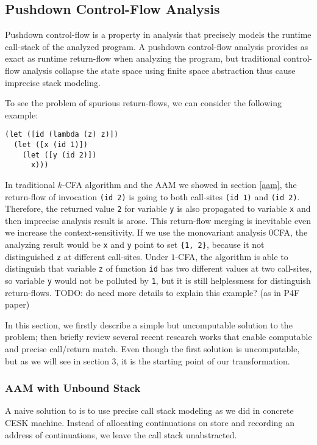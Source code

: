 \documentclass[acmsmall,review,anonymous]{acmart}\settopmatter{printfolios=true,printccs=false,printacmref=false}
\begin{document}
\subsection{Pushdown Control-Flow Analysis}

Pushdown control-flow is a property in analysis that precisely models
the runtime call-stack of the analyzed program. 
A pushdown control-flow analysis provides as exact as runtime return-flow 
when analyzing the program, but traditional control-flow analysis collapse 
the state space using finite space abstraction thus cause imprecise stack modeling.

To see the problem of spurious return-flows, we can consider the following example:

\begin{verbatim}
(let ([id (lambda (z) z)])
  (let ([x (id 1)])
    (let ([y (id 2)])
      x)))
\end{verbatim}

In traditional $k$-CFA algorithm and the AAM we showed in section \ref{aam}, 
the return-flow of invocation \texttt{(id 2)} 
is going to both call-sites \texttt{(id 1)} and \texttt{(id 2)}. Therefore, the
returned value \texttt{2} for variable \texttt{y} is also propagated to 
variable \texttt{x} and then imprecise analysis result is arose.
This return-flow merging is inevitable even we increase the context-sensitivity.
If we use the monovariant analysis 0CFA, the analyzing result would be \texttt{x} and 
\texttt{y} point to set \texttt{\{1, 2\}}, because it not distinguished 
\texttt{z} at different call-sites.
Under $1$-CFA, the algorithm is able to distinguish that variable \texttt{z} of function
\texttt{id} has two different values at two call-sites, so variable \texttt{y} 
would not be polluted by \texttt{1}, but it is still helplessness for distinguish
return-flows.
TODO: do need more details to explain this example? (as in P4F paper)

In this section, we firstly describe a simple but uncomputable solution to the
problem; then briefly review several recent research works that enable
computable and precise call/return match. Even though the first solution is
uncomputable, but as we will see in section 3, it is the starting point of our
transformation. 

\subsubsection{AAM with Unbound Stack}

A naive solution to is to use precise call stack modeling as we did in concrete
CESK machine. Instead of allocating continuations on store and recording an 
address of continuations, we leave the call stack unabstracted. 
\end{document}
